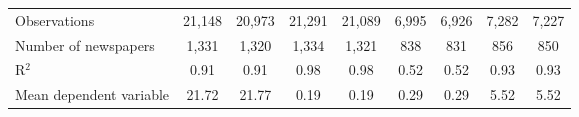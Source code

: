 {\begin{tabular}{l*{8}{c}}
\midrule
Observations        &      21,148         &      20,973         &      21,291         &      21,089         &       6,995         &       6,926         &       7,282         &       7,227         \\
Number of newspapers&       1,331         &       1,320         &       1,334         &       1,321         &         838         &         831         &         856         &         850         \\
R$^2$               &        0.91         &        0.91         &        0.98         &        0.98         &        0.52         &        0.52         &        0.93         &        0.93         \\
Mean dependent variable&       21.72         &       21.77         &        0.19         &        0.19         &        0.29         &        0.29         &        5.52         &        5.52         \\
\bottomrule
\end{tabular}
}
